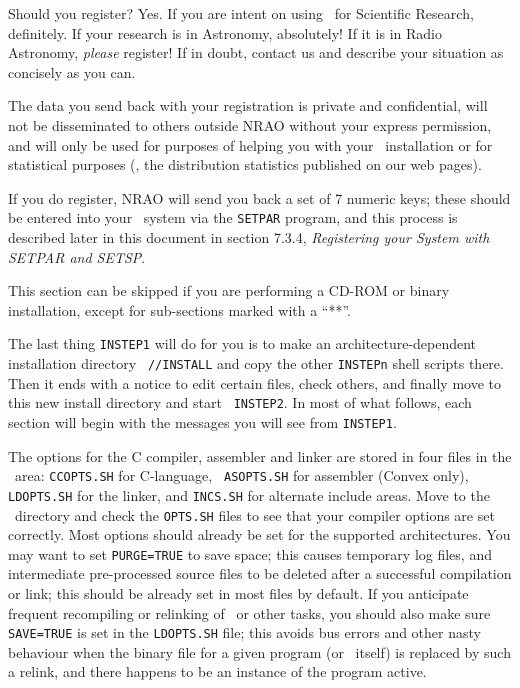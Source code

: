 Should you register?  Yes.  If you are intent on using \AIPS\ for
Scientific Research, definitely.  If your research is in Astronomy,
absolutely!  If it is in Radio Astronomy, {\it please\/} register!  If
in doubt, contact us and describe your situation as concisely as you
can.

The data you send back with your registration is private and
confidential, will not be disseminated to others outside NRAO without
your express permission, and will only be used for purposes of helping
you with your \AIPS\ installation or for statistical purposes (\ie, the
distribution statistics published on our web pages).

If you do register, NRAO will send you back a set of 7 numeric keys;
these should be entered into your \AIPS\ system via the {\tt SETPAR}
program, and this process is described later in this document in section
7.3.4,
{\it Registering your System with SETPAR and SETSP\/}.

\bigskip{}

This section can be skipped if you are performing a CD-ROM or binary
installation, except for sub-sections marked with a ``**''.

The last thing {\tt INSTEP1} will do for you is to make an
architecture-dependent installation directory {\tt
\THISVER/\ARCH/INSTALL} and copy the other {\tt INSTEPn} shell
scripts there.  Then it ends with a notice to edit certain files, check
others, and finally move to this new install directory and start {\tt
INSTEP2}. In most of what follows, each section will begin with the
messages you will see from {\tt INSTEP1}.

\medskip{}

The options for the C compiler, assembler and linker are stored in four
files in the \SYSL\ area: {\tt CCOPTS.SH} for C-language, {\tt
ASOPTS.SH} for assembler (Convex only), {\tt LD\-OPTS.SH} for the
linker, and {\tt INCS.SH} for alternate include areas.  Move to the
\SYSL\ directory and check the {\tt *OPTS.SH} files to see that your
compiler options are set correctly.  Most options should already be set
for the supported architectures.  You may want to set {\tt PURGE=TRUE}
to save space; this causes temporary log files, and intermediate
pre-processed source files to be deleted after a successful compilation
or link; this should be already set in most files by default.  If you
anticipate frequent recompiling or relinking of \AIPS\ or other tasks,
you should also make sure {\tt SAVE=TRUE} is set in the {\tt LDOPTS.SH}
file; this avoids bus errors and other nasty behaviour when the binary
file for a given program (or \ttaips\ itself) is replaced by such a
relink, and there happens to be an instance of the program active.

